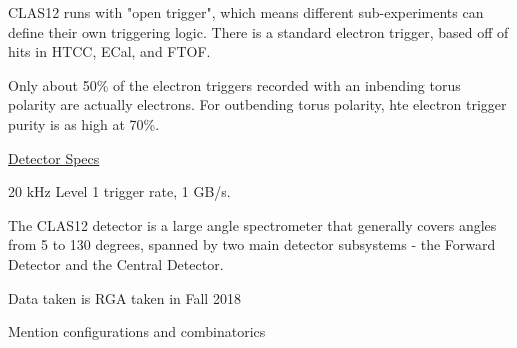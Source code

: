 
            CLAS12 runs with "open trigger", which means different sub-experiments can define their own triggering logic. There is a standard electron trigger, based off of hits in HTCC, ECal, and FTOF. 

        Only about 50\% of the electron triggers recorded with an inbending torus polarity are actually electrons. For outbending torus polarity, hte electron trigger purity is as high at 70\%. 
    
    \href{https://www.jlab.org/Hall-B/clas12-web/}{Detector Specs}
    
    20 kHz Level 1 trigger rate, 1 GB/s.

   The CLAS12 detector is a large angle spectrometer that generally covers angles from 5 to 130 degrees, spanned by two main detector subsystems - the Forward Detector and the Central Detector.

    


        Data taken is RGA taken in Fall 2018

        Mention configurations and combinatorics
        